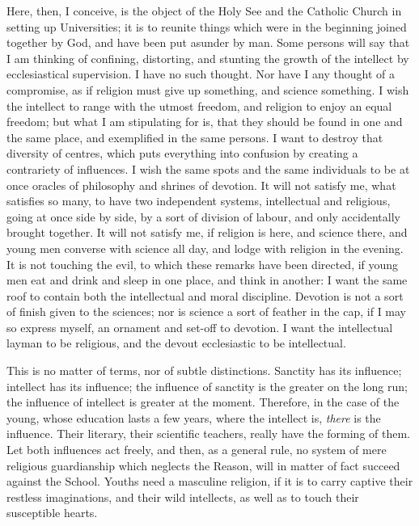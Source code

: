Here, then, I conceive, is the object of the Holy See
and the Catholic Church in setting up Universities; it is
to reunite things which were in the beginning joined
together by God, and have been put asunder by man. Some
persons will say that I am thinking of confining,
distorting, and stunting the growth of the intellect by
ecclesiastical supervision. I have no such thought. Nor
have I any thought of a compromise, as if religion must
give up something, and science something. I wish the
intellect to range with the utmost freedom, and religion
to enjoy an equal freedom; but what I am stipulating for
is, that they should be found in one and the same place,
and exemplified in the same persons. I want to destroy
that diversity of centres, which puts everything into
confusion by creating a contrariety of influences. I wish
the same spots and the same individuals to be at once
oracles of philosophy and shrines of devotion. It will
not satisfy me, what satisfies so many, to have two
independent systems, intellectual and religious, going at
once side by side, by a sort of division of labour, and
only accidentally brought together. It will not satisfy
me, if religion is here, and science there, and young men
converse with science all day, and lodge with religion in
the evening. It is not touching the evil, to which these
remarks have been directed, if young men eat and drink
and sleep in one place, and think in another: I want the
same roof to contain both the intellectual and moral
discipline. Devotion is not a sort of finish given to the
sciences; nor is science a sort of feather in the cap, if
I may so express myself, an ornament and set-off to
devotion. I want the intellectual layman to be religious,
and the devout ecclesiastic to be intellectual.

This is no matter of terms, nor of subtle
distinctions. Sanctity has its influence; intellect has
its influence; the influence of sanctity is the greater
on the long run; the influence of intellect is greater at
the moment. Therefore, in the case of the young, whose
education lasts a few years, where the intellect is, \emph{there}
is the influence. Their literary, their scientific
teachers, really have the forming of them. Let both
influences act freely, and then, as a general rule, no
system of mere religious guardianship which neglects the
Reason, will in matter of fact succeed against the
School. Youths need a masculine religion, if it is to
carry captive their restless imaginations, and their wild
intellects, as well as to touch their susceptible hearts.

